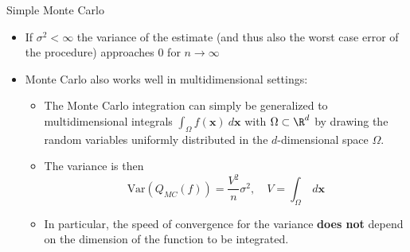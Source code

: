 \documentclass[11pt,compress,t,notes=noshow, xcolor=table]{beamer}
\begin{document}
\begin{vbframe}{Simple Monte Carlo}
\begin{itemize}
\framebreak


\item If $\sigma^2 < \infty$ the variance of the estimate (and thus also the worst case error of the procedure) approaches $0$ for $n \to \infty$
\item Monte Carlo also works well in multidimensional settings:
\vspace*{-0.2cm}
\begin{itemize}
\item The Monte Carlo integration can simply be generalized to multidimensional integrals $\int_\Omega f(\bm{x}) ~ d\bm{x}$ with $\Omega \subset \R^d$ by drawing the random variables uniformly distributed in the $d$-dimensional space $\Omega$.
\item The variance is then
$$
    \text{Var}\left(Q_{MC}(f)\right) = \frac{V^2}{n} \sigma^2, \quad V = \int_\Omega ~ d\bm{x}
$$
\item In particular, the speed of convergence for the variance \textbf{does not} depend on the dimension of the function to be integrated.
\end{itemize}
\end{itemize}
\end{vbframe}
\end{document}
